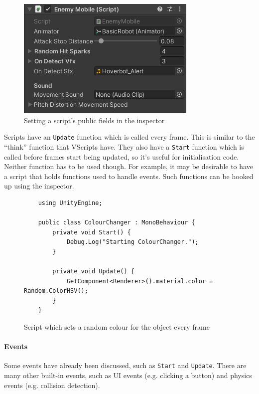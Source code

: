 \documentclass[a4paper, 12pt]{scrartcl}
\begin{document}
\begin{figure}[!htp]
  \centering
  \includegraphics[scale=0.75]{images/unity_script_inspector.png}
  \caption{Setting a script's public fields in the inspector}
  \label{fig:unity_script_inspector}
\end{figure}

Scripts have an \texttt{Update} function which is called every frame. This is similar to the ``think'' function that VScripts have. They also have a \texttt{Start} function which is called before frames start being updated, so it's useful for initialisation code. Neither function has to be used though. For example, it may be desirable to have a script that holds functions used to handle events. Such functions can be hooked up using the inspector.

\begin{figure}[!htp]
  \begin{verbatim}
    using UnityEngine;

    public class ColourChanger : MonoBehaviour {
        private void Start() {
            Debug.Log("Starting ColourChanger.");
        }

        private void Update() {
            GetComponent<Renderer>().material.color = Random.ColorHSV();
        }
    }
  \end{verbatim}
  \caption{Script which sets a random colour for the object every frame}
  \label{fig:unity_script}
\end{figure}

\paragraph{Events}
Some events have already been discussed, such as \texttt{Start} and \texttt{Update}. There are many other built-in events, such as UI events (e.g. clicking a button) and physics events (e.g. collision detection).
\end{document}
